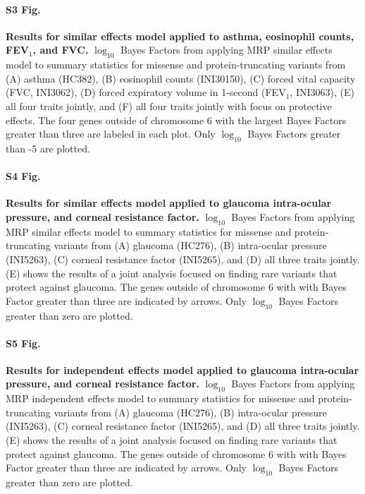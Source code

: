 \paragraph*{S3 Fig.}
\label{asthma_similar}
{\bf Results for similar effects model applied to asthma, eosinophil counts, FEV$_1$, and FVC.} $\log_{10}$ Bayes Factors from applying MRP similar effects model to summary statistics for missense and protein-truncating variants from (A) asthma (HC382), (B) eosinophil counts (INI30150), (C) forced vital capacity (FVC, INI3062), (D) forced expiratory volume in 1-second (FEV$_1$, INI3063), (E) all four traits jointly, and (F) all four traits jointly with focus on protective effects. The four genes outside of chromosome 6 with the largest Bayes Factors greater than three are labeled in each plot. Only $\log_{10}$ Bayes Factors greater than -5 are plotted.

\paragraph*{S4 Fig.}
\label{glaucoma_similar}
{\bf Results for similar effects model applied to glaucoma intra-ocular pressure, and corneal resistance factor.} $\log_{10}$ Bayes Factors from applying MRP similar effects model to summary statistics for missense and protein-truncating variants from (A) glaucoma (HC276), (B) intra-ocular pressure (INI5263), (C) corneal resistance factor (INI5265), and (D) all three traits jointly. (E) shows the results of a joint analysis focused on finding rare variants that protect against glaucoma. The genes outside of chromosome 6 with with Bayes Factor greater than three are indicated by arrows. Only $\log_{10}$ Bayes Factors greater than zero are plotted.

\paragraph*{S5 Fig.}
\label{glaucoma_independent}
{\bf Results for independent effects model applied to glaucoma intra-ocular pressure, and corneal resistance factor.} $\log_{10}$ Bayes Factors from applying MRP independent effects model to summary statistics for missense and protein-truncating variants from (A) glaucoma (HC276), (B) intra-ocular pressure (INI5263), (C) corneal resistance factor (INI5265), and (D) all three traits jointly. (E) shows the results of a joint analysis focused on finding rare variants that protect against glaucoma. The genes outside of chromosome 6 with with Bayes Factor greater than three are indicated by arrows. Only $\log_{10}$ Bayes Factors greater than zero are plotted.


